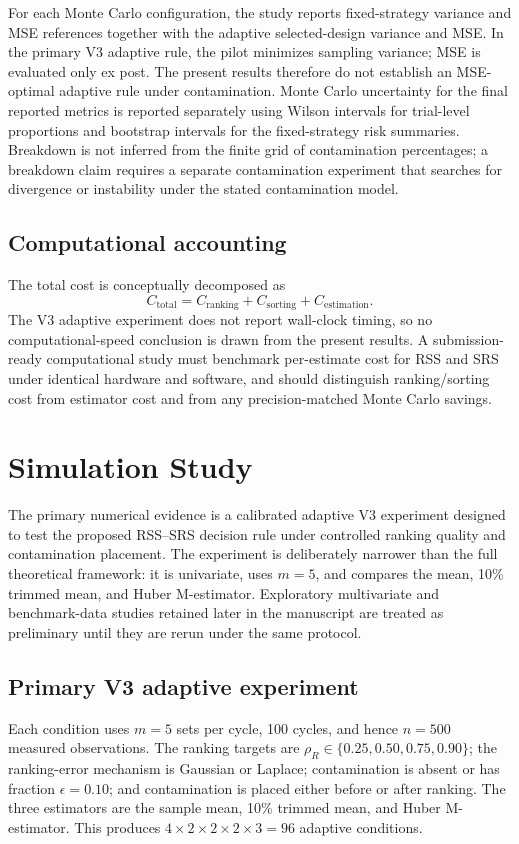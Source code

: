 \documentclass[12pt]{article}
\begin{document}
For each Monte Carlo configuration, the study reports fixed-strategy variance and MSE references together with the adaptive selected-design variance and MSE. In the primary V3 adaptive rule, the pilot minimizes sampling variance; MSE is evaluated only ex post. The present results therefore do not establish an MSE-optimal adaptive rule under contamination. Monte Carlo uncertainty for the final reported metrics is reported separately using Wilson intervals for trial-level proportions and bootstrap intervals for the fixed-strategy risk summaries. Breakdown is not inferred from the finite grid of contamination percentages; a breakdown claim requires a separate contamination experiment that searches for divergence or instability under the stated contamination model.

\subsection{Computational accounting}
The total cost is conceptually decomposed as
\[
C_{\mathrm{total}}=C_{\mathrm{ranking}}+C_{\mathrm{sorting}}+C_{\mathrm{estimation}}.
\]
The V3 adaptive experiment does not report wall-clock timing, so no computational-speed conclusion is drawn from the present results. A submission-ready computational study must benchmark per-estimate cost for RSS and SRS under identical hardware and software, and should distinguish ranking/sorting cost from estimator cost and from any precision-matched Monte Carlo savings.

\section{Simulation Study}
\label{sec:simulation}
The primary numerical evidence is a calibrated adaptive V3 experiment designed to test the proposed RSS--SRS decision rule under controlled ranking quality and contamination placement. The experiment is deliberately narrower than the full theoretical framework: it is univariate, uses $m=5$, and compares the mean, 10\% trimmed mean, and Huber M-estimator. Exploratory multivariate and benchmark-data studies retained later in the manuscript are treated as preliminary until they are rerun under the same protocol.

\subsection{Primary V3 adaptive experiment}
\label{subsec:v3_adaptive}
Each condition uses $m=5$ sets per cycle, 100 cycles, and hence $n=500$ measured observations. The ranking targets are $\rho_R\in\{0.25,0.50,0.75,0.90\}$; the ranking-error mechanism is Gaussian or Laplace; contamination is absent or has fraction $\epsilon=0.10$; and contamination is placed either before or after ranking. The three estimators are the sample mean, 10\% trimmed mean, and Huber M-estimator. This produces $4\times2\times2\times2\times3=96$ adaptive conditions.
\end{document}
